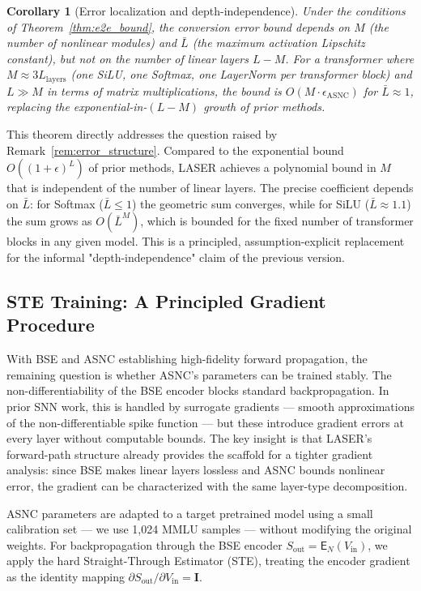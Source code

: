 \documentclass{article}
\theoremstyle{plain}
\newtheorem{corollary}[theorem]{Corollary}
\theoremstyle{definition}
\theoremstyle{remark}
\begin{document}
\begin{corollary}[Error localization and depth-independence]
\label{cor:asnc_local_main}
Under the conditions of Theorem~\ref{thm:e2e_bound}, the conversion error bound
depends on $M$ (the number of nonlinear modules) and $\bar{L}$ (the maximum
activation Lipschitz constant), but not on the number of linear layers $L - M$.
For a transformer where $M \approx 3L_{\mathrm{layers}}$ (one SiLU, one Softmax,
one LayerNorm per transformer block) and $L \gg M$ in terms of matrix multiplications,
the bound is $O(M \cdot \epsilon_{\mathrm{ASNC}})$ for $\bar{L} \approx 1$, replacing
the exponential-in-$(L-M)$ growth of prior methods.
\end{corollary}

This theorem directly addresses the question raised by Remark~\ref{rem:error_structure}.
Compared to the exponential bound $O((1+\epsilon)^L)$ of prior methods, LASER achieves
a polynomial bound in $M$ that is independent of the number of linear layers.
The precise coefficient depends on $\bar{L}$: for Softmax ($\bar{L} \le 1$) the
geometric sum converges, while for SiLU ($\bar{L} \approx 1.1$) the sum grows as
$O(\bar{L}^M)$, which is bounded for the fixed number of transformer blocks in any
given model. This is a principled, assumption-explicit replacement for the
informal "depth-independence" claim of the previous version.

\subsection{STE Training: A Principled Gradient Procedure}
\label{subsec:ste}

With BSE and ASNC establishing high-fidelity forward propagation, the remaining
question is whether ASNC's parameters can be trained stably. The non-differentiability
of the BSE encoder blocks standard backpropagation. In prior SNN work, this is
handled by surrogate gradients — smooth approximations of the non-differentiable spike
function — but these introduce gradient errors at every layer without computable bounds.
The key insight is that LASER's forward-path structure already provides the scaffold for
a tighter gradient analysis: since BSE makes linear layers lossless and ASNC bounds
nonlinear error, the gradient can be characterized with the same layer-type
decomposition.

ASNC parameters are adapted to a target pretrained model using a small calibration
set — we use 1,024 MMLU samples — without modifying the original weights. For
backpropagation through the BSE encoder $S_{\mathrm{out}} = \mathsf{E}_N(V_{\mathrm{in}})$,
we apply the hard Straight-Through Estimator (STE), treating the encoder gradient as
the identity mapping $\partial S_{\mathrm{out}} / \partial V_{\mathrm{in}} = \mathbf{I}$.
\end{document}
